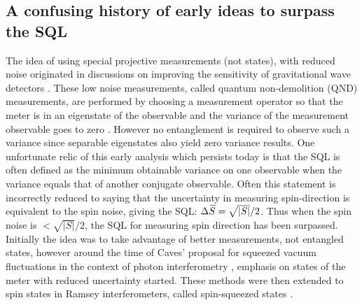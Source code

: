 \documentclass[reqno]{amsart}
\newcommand{\myvec}[1]{\accentset{\rightharpoonup}{#1}}
\begin{document}
\subsection{A confusing history of early ideas to surpass the SQL}\label{App:History}
The idea of using special projective measurements (not states), with reduced noise originated in discussions on improving the sensitivity of gravitational wave detectors \cite{Braginsky1974, Braginsky1977, Unruh1979, Braginsky1996}. These low noise measurements, called quantum non-demolition (QND) measurements, are performed by choosing a measurement operator so that the meter is in an eigenstate of the observable and the variance of the measurement observable goes to zero \cite{Unruh1978, Braginsky1980}. However no entanglement is required to observe such a variance since separable eigenstates also yield zero variance results. One unfortunate relic of this early analysis which persists today is that the SQL is often defined as the minimum obtainable variance on one observable when the variance equals that of another conjugate observable. Often this statement is incorrectly reduced to saying that the uncertainty in measuring spin-direction is equivalent to the spin noise, giving the SQL: $\Delta \myvec{S} = \sqrt{|S|}/2$. Thus when the spin noise is $< \sqrt{|S|}/2$, the SQL for measuring spin direction has been surpassed. Initially the idea was to take advantage of better measurements, not entangled states, however around the time of Caves' proposal for squeezed vacuum fluctuations in the context of photon interferometry \cite{Caves1981}, emphasis on states of the meter with reduced uncertainty started. These methods were then extended to spin states in Ramsey interferometers, called spin-squeezed states \cite{Kitagawa1991, Wineland1992, Kitagawa1993}.
\end{document}

